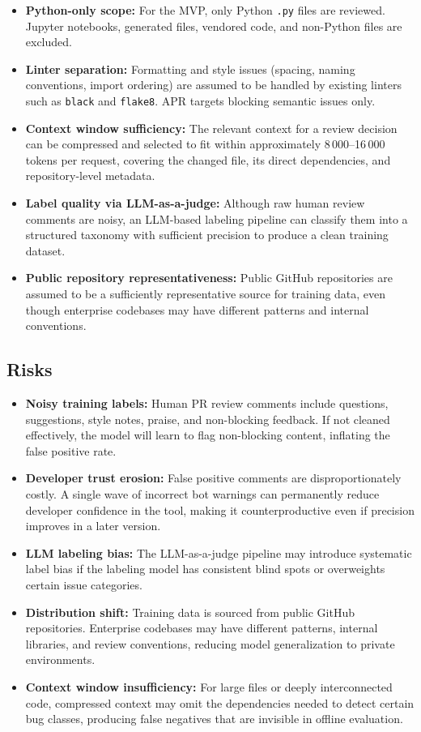 \documentclass[11pt]{article}
\begin{document}
\begin{itemize}
    \item \textbf{Python-only scope:} For the MVP, only Python \texttt{.py} files are reviewed. Jupyter notebooks, generated files, vendored code, and non-Python files are excluded.
    \item \textbf{Linter separation:} Formatting and style issues (spacing, naming conventions, import ordering) are assumed to be handled by existing linters such as \texttt{black} and \texttt{flake8}. APR targets blocking semantic issues only.
    \item \textbf{Context window sufficiency:} The relevant context for a review decision can be compressed and selected to fit within approximately 8\,000--16\,000 tokens per request, covering the changed file, its direct dependencies, and repository-level metadata.
    \item \textbf{Label quality via LLM-as-a-judge:} Although raw human review comments are noisy, an LLM-based labeling pipeline can classify them into a structured taxonomy with sufficient precision to produce a clean training dataset.
    \item \textbf{Public repository representativeness:} Public GitHub repositories are assumed to be a sufficiently representative source for training data, even though enterprise codebases may have different patterns and internal conventions.
\end{itemize}

\subsection*{Risks}

\begin{itemize}
    \item \textbf{Noisy training labels:} Human PR review comments include questions, suggestions, style notes, praise, and non-blocking feedback. If not cleaned effectively, the model will learn to flag non-blocking content, inflating the false positive rate.
    \item \textbf{Developer trust erosion:} False positive comments are disproportionately costly. A single wave of incorrect bot warnings can permanently reduce developer confidence in the tool, making it counterproductive even if precision improves in a later version.
    \item \textbf{LLM labeling bias:} The LLM-as-a-judge pipeline may introduce systematic label bias if the labeling model has consistent blind spots or overweights certain issue categories.
    \item \textbf{Distribution shift:} Training data is sourced from public GitHub repositories. Enterprise codebases may have different patterns, internal libraries, and review conventions, reducing model generalization to private environments.
    \item \textbf{Context window insufficiency:} For large files or deeply interconnected code, compressed context may omit the dependencies needed to detect certain bug classes, producing false negatives that are invisible in offline evaluation.
\end{itemize}
\end{document}
